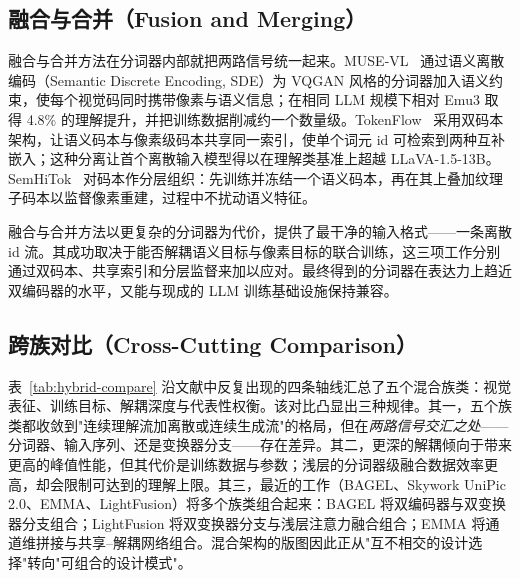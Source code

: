\subsection{融合与合并（Fusion and Merging）}
\label{subsec:fusion-merging}

融合与合并方法在分词器内部就把两路信号统一起来。MUSE-VL~\cite{DBLP:conf/iccv/XieDSL25} 通过语义离散编码（Semantic Discrete Encoding, SDE）为 VQGAN 风格的分词器加入语义约束，使每个视觉码同时携带像素与语义信息；在相同 LLM 规模下相对 Emu3 取得 4.8\% 的理解提升，并把训练数据削减约一个数量级。TokenFlow~\cite{DBLP:conf/cvpr/QuZLWJGYDYW25} 采用双码本架构，让语义码本与像素级码本共享同一索引，使单个词元 id 可检索到两种互补嵌入；这种分离让首个离散输入模型得以在理解类基准上超越 LLaVA-1.5-13B。SemHiTok~\cite{chen2025semhitok} 对码本作分层组织：先训练并冻结一个语义码本，再在其上叠加纹理子码本以监督像素重建，过程中不扰动语义特征。

融合与合并方法以更复杂的分词器为代价，提供了最干净的输入格式——一条离散 id 流。其成功取决于能否解耦语义目标与像素目标的联合训练，这三项工作分别通过双码本、共享索引和分层监督来加以应对。最终得到的分词器在表达力上趋近双编码器的水平，又能与现成的 LLM 训练基础设施保持兼容。

\subsection{跨族对比（Cross-Cutting Comparison）}
\label{subsec:hybrid-comparison}

表~\ref{tab:hybrid-compare} 沿文献中反复出现的四条轴线汇总了五个混合族类：视觉表征、训练目标、解耦深度与代表性权衡。该对比凸显出三种规律。其一，五个族类都收敛到"连续理解流加离散或连续生成流"的格局，但在\emph{两路信号交汇之处}——分词器、输入序列、还是变换器分支——存在差异。其二，更深的解耦倾向于带来更高的峰值性能，但其代价是训练数据与参数；浅层的分词器级融合数据效率更高，却会限制可达到的理解上限。其三，最近的工作（BAGEL、Skywork UniPic 2.0、EMMA、LightFusion）将多个族类组合起来：BAGEL 将双编码器与双变换器分支组合；LightFusion 将双变换器分支与浅层注意力融合组合；EMMA 将通道维拼接与共享--解耦网络组合。混合架构的版图因此正从"互不相交的设计选择"转向"可组合的设计模式"。

